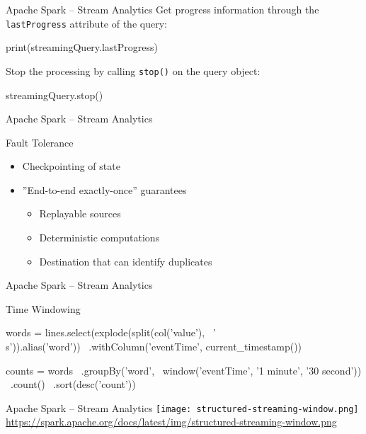\documentclass[ignorenonframetext,xcolor=x11names]{beamer}
\begin{document}
\begin{frame}[fragile]{Apache Spark -- Stream Analytics}
Get progress information through the \texttt{lastProgress} attribute of the query:
\begin{pythoncode}
print(streamingQuery.lastProgress)
\end{pythoncode}
Stop the processing by calling \texttt{stop()} on the query object:
\begin{pythoncode}
streamingQuery.stop()
\end{pythoncode}
\end{frame}

\begin{frame}[fragile]{Apache Spark -- Stream Analytics}
\begin{block}{Fault Tolerance}
\begin{itemize}
   \item Checkpointing of state
   \item ''End-to-end exactly-once'' guarantees
   \begin{itemize}
       \item Replayable sources
       \item Deterministic computations   
       \item Destination that can identify duplicates
   \end{itemize}
\end{itemize}
\end{block}
\end{frame}

\begin{frame}[fragile]{Apache Spark -- Stream Analytics}
\begin{block}{Time Windowing}
\begin{pythoncode}
words = lines.select(explode(split(col('value'), \
    '\\s')).alias('word')) \
    .withColumn('eventTime', current_timestamp())

counts = words \
    .groupBy('word', \
        window('eventTime', '1 minute', '30 second')) \
    .count() \
    .sort(desc('count'))
\end{pythoncode}
\end{block}
\end{frame}

\begin{frame}{Apache Spark -- Stream Analytics}
\texttt{[image: structured-streaming-window.png]} \\

\scriptsize\url{https://spark.apache.org/docs/latest/img/structured-streaming-window.png}
\end{frame}
\end{document}

